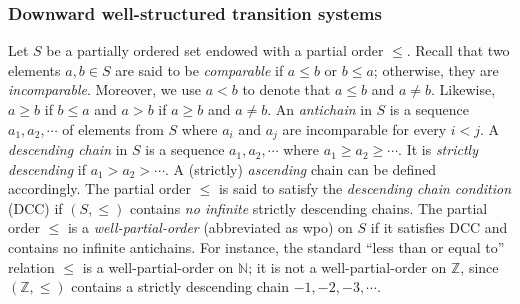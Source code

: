 \documentclass[preprint,12pt]{elsarticle}
\newcommand\Int{\mathbb{Z} }
\newcommand\Nat{\mathbb{N} }
\newcommand{\tl}[1]{\color{magenta} {TL: #1 :LT} \color{black}}
\newcommand{\tl}[1]{}
\begin{document}

\subsubsection{Downward well-structured transition systems}


Let $S$ be a partially ordered set endowed with a partial order $\leq$. Recall that two elements $a,b\in S$ are said to be \emph{comparable} if $a\leq b$ or $b\leq a$; otherwise, they are \emph{incomparable}.
Moreover, we use $a < b$ to denote that $a \leq b$ and $a \neq b$. Likewise, $a \geq b$ if $b \leq a$ and $a > b$ if $a \geq b$ and $a \neq b$.
%
An \emph{antichain} in $S$ is a sequence $a_1, a_2, \cdots$ of elements from $S$ where $a_i$ and $a_j$ are incomparable for every $ i < j$.
A \emph{descending chain} in $S$ is a sequence $a_1, a_2, \cdots$ where $a_1 \geq a_2 \geq \cdots$. It is \emph{strictly descending} if $a_1 > a_2 > \cdots$. 
A (strictly) \emph{ascending} chain can be defined accordingly.  
%
The partial order $\leq$ is said to satisfy %
the \emph{descending chain condition} (DCC) if $(S, \leq)$ contains \emph{no infinite} strictly descending chains.
The partial order $\leq$ is a \emph{well-partial-order} (abbreviated as wpo) on $S$ if it satisfies DCC and contains no infinite antichains.  For instance, the standard ``less than or equal to'' relation $\leq$ is a well-partial-order on $\Nat$; it is not a well-partial-order on $\Int$, since $(\Int, \leq)$ contains a strictly descending chain $-1, -2, -3, \cdots$. 
\end{document}
